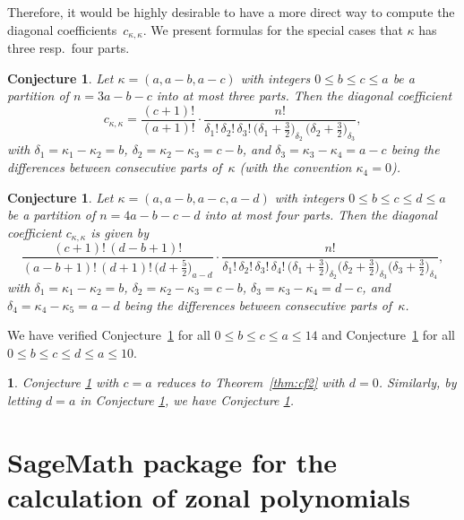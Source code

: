 \documentclass[smallextended]{svjour3}
\newtheorem{rem}[thm]{\protect\remarkname}
\newtheorem{conj}[thm]{Conjecture}
\providecommand{\remarkname}{Remark}
\begin{document}
Therefore, it would be highly desirable to have a more direct way to compute
the diagonal coefficients~$c_{\kappa,\kappa}$. We present formulas for the
special cases that $\kappa$ has three resp.\ four parts.

\begin{conj}\label{conj:diag3}
  Let $\kappa=(a,a-b,a-c)$ with integers $0\leq b\leq c\leq a$ be a partition
  of $n=3a-b-c$ into at most three parts. Then the diagonal coefficient
 \[ 
 c_{\kappa,\kappa}=\frac{(c+1)!}{(a+1)!} \cdot \frac{n!}{\delta_1! \, \delta_2! \, \delta_3! \,
     \bigl(\delta_1+\frac32\bigr)_{\!\delta_2} \, \bigl(\delta_2+\frac32\bigr)_{\!\delta_3}}, 
 \] 
  with $\delta_1=\kappa_1-\kappa_2=b$, $\delta_2=\kappa_2-\kappa_3=c-b$, and
  $\delta_3=\kappa_3-\kappa_4=a-c$ being the differences between consecutive
  parts of~$\kappa$ (with the convention $\kappa_4=0$).
\end{conj}

\begin{conj}\label{conj:diag4}
  Let $\kappa=(a,a-b,a-c,a-d)$ with integers $0\leq b\leq c\leq d\leq a$ be a
  partition of $n=4a-b-c-d$ into at most four parts. Then the diagonal
  coefficient $c_{\kappa,\kappa}$ is given by
\[
\frac{(c+1)! \, (d-b+1)!}{(a-b+1)! \, (d+1)! \,  \bigl(d+\frac52\bigr)_{\!a-d}}
    \cdot \frac{n!}{\delta_1! \, \delta_2! \, \delta_3! \, \delta_4! \,
      \bigl(\delta_1+\frac32\bigr)_{\!\delta_2} \bigl(\delta_2+\frac32\bigr)_{\!\delta_3} \bigl(\delta_3+\frac32\bigr)_{\!\delta_4}},  
\]
  with $\delta_1=\kappa_1-\kappa_2=b$, $\delta_2=\kappa_2-\kappa_3=c-b$,
  $\delta_3=\kappa_3-\kappa_4=d-c$, and $\delta_4=\kappa_4-\kappa_5=a-d$ being
  the differences between consecutive parts of~$\kappa$.
\end{conj}

We have verified Conjecture~\ref{conj:diag3} for all $0\leq b\leq c\leq a\leq
14$ and Conjecture~\ref{conj:diag4} for all $0\leq b\leq c\leq d\leq a\leq
10$.

\begin{rem}
Conjecture \ref{conj:diag3} with $c=a$ reduces to  Theorem~\ref{thm:cf2}  with $d=0$. Similarly, by letting $d=a$ in
Conjecture \ref{conj:diag4}, we have Conjecture \ref{conj:diag3}. 
\end{rem}


\section{SageMath package for the calculation of zonal polynomials}\label{sec:Package}
\end{document}
